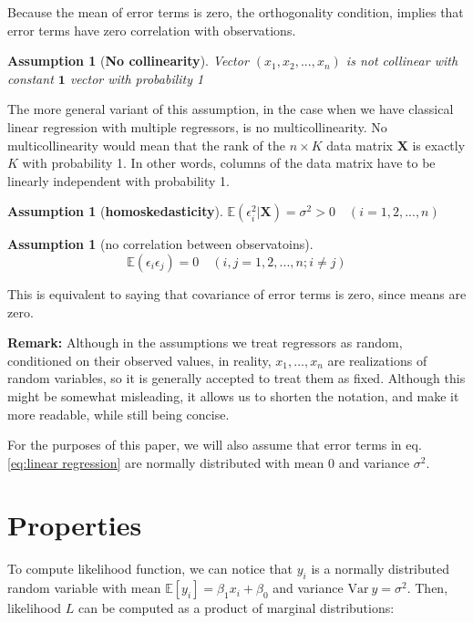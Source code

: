 \documentclass[12pt,a4paper,oneside]{book} %
\newtheorem{assumption}[theorem]{Assumption}
\newcommand{\E}{\mathbb{E}}
\newcommand{\Var}{\mathrm{Var}}
\begin{document}
Because the mean of error terms is zero, the orthogonality condition, implies that error terms have zero correlation with observations.

\begin{assumption}[\textbf{No collinearity}]
	Vector $(x_1, x_2,...,x_n)$ is not collinear with constant $\mathbf{1}$ vector with probability 1
\end{assumption}

The more general variant of this assumption, in the case when we have classical linear regression with multiple regressors, is no multicollinearity. No multicollinearity would mean that the rank of the $n \times K$ data matrix $\mathbf{X}$ is exactly $K$ with probability 1. In other words, columns of the data matrix have to be linearly independent with probability 1.

\begin{assumption}[\textbf{homoskedasticity}]
	$\E(\epsilon_i^2| \mathbf{X}) = \sigma^2 > 0 \quad (i=1,2,...,n)$
\end{assumption}

\begin{assumption}[no correlation between observatoins]
	\[\E (\epsilon_i \epsilon_j) = 0 \quad (i,j = 1, 2, ..., n; i \neq j) \]
\end{assumption}

This is equivalent to saying that covariance of error terms is zero, since means are zero.

\textbf{Remark:} Although in the assumptions we treat regressors as random, conditioned on their observed values, in reality, $x_1, ..., x_n$ are realizations of random variables, so it is generally accepted to treat them as fixed. Although this might be somewhat misleading, it allows us to shorten the notation, and make it more readable, while still being concise.

For the purposes of this paper, we will also assume that error terms in eq. \ref{eq:linear regression}  are normally distributed with mean 0 and variance $\sigma^2$.

\section{Properties}

To compute likelihood function, we can notice that $y_i$ is a normally distributed random variable with mean $\E [y_i] = \beta_1 x_i + \beta_0$ and variance $\Var \ y = \sigma^2$. Then, likelihood $L$ can be computed as a product of marginal distributions:
\end{document}

